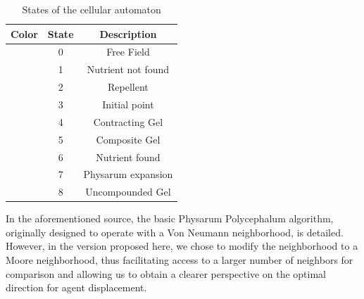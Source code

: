 \documentclass[conference]{IEEEtran}
\begin{document}
    \begin{table}[htbp]
        \caption{States of the cellular automaton}
        \begin{center}
        \begin{tabular}{|c|c|c|}
        \hline
        \textbf{Color}&\textbf{State}&\textbf{Description} \\
        \hline
        \cellcolor{blue} & 0 & Free Field  \\
        \cellcolor{royalblue} & 1 & Nutrient not found \\
        \cellcolor{red} & 2 & Repellent \\
        \cellcolor{black} & 3 & Initial point \\
        \cellcolor{yellow} & 4 & Contracting Gel \\
        \cellcolor{darkgreen} & 5 & Composite Gel \\
        \cellcolor{lemon} & 6 & Nutrient found \\
        \cellcolor{darkgray} & 7 & Physarum expansion \\
        \cellcolor{green} & 8 &  Uncompounded Gel\\
        \hline
        \end{tabular}
        \end{center}
    \end{table}
    \vskip 1cm
    In the aforementioned source, the basic Physarum Polycephalum algorithm, originally designed to operate with a Von 
        Neumann neighborhood, is detailed. However, in the version proposed here, we chose to modify the neighborhood to a Moore neighborhood, 
        thus facilitating access to a larger number of neighbors for comparison and allowing us to obtain a clearer perspective on the optimal 
        direction for agent displacement.
\end{document}
